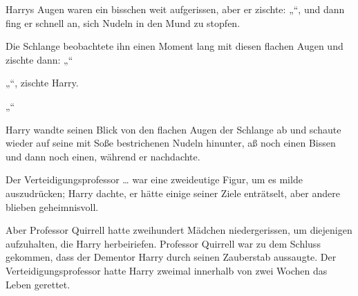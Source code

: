 Harrys Augen waren ein bisschen weit aufgerissen, aber er zischte: „“, und dann fing er schnell an, sich Nudeln in den Mund zu stopfen.

Die Schlange beobachtete ihn einen Moment lang mit diesen flachen Augen und zischte dann: „“

„“, zischte Harry.

„“

Harry wandte seinen Blick von den flachen Augen der Schlange ab und schaute wieder auf seine mit Soße bestrichenen Nudeln hinunter, aß noch einen Bissen und dann noch einen, während er nachdachte.

Der Verteidigungsprofessor … war eine zweideutige Figur, um es milde auszudrücken; Harry dachte, er hätte einige seiner Ziele enträtselt, aber andere blieben geheimnisvoll.

Aber Professor Quirrell hatte zweihundert Mädchen niedergerissen, um diejenigen aufzuhalten, die Harry herbeiriefen. Professor Quirrell war zu dem Schluss gekommen, dass der Dementor Harry durch seinen Zauberstab aussaugte. Der Verteidigungsprofessor hatte Harry zweimal innerhalb von zwei Wochen das Leben gerettet.

